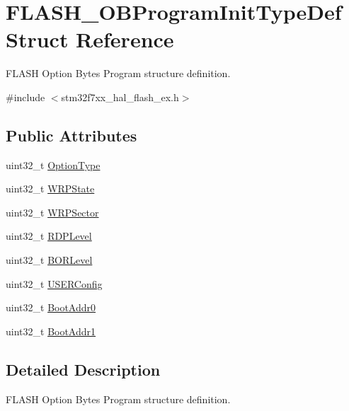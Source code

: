 \hypertarget{struct_f_l_a_s_h___o_b_program_init_type_def}{}\section{F\+L\+A\+S\+H\+\_\+\+O\+B\+Program\+Init\+Type\+Def Struct Reference}
\label{struct_f_l_a_s_h___o_b_program_init_type_def}


F\+L\+A\+SH Option Bytes Program structure definition.  




{\ttfamily \#include $<$stm32f7xx\+\_\+hal\+\_\+flash\+\_\+ex.\+h$>$}

\subsection*{Public Attributes}
\begin{DoxyCompactItemize}
\item 
uint32\+\_\+t \mbox{\hyperlink{struct_f_l_a_s_h___o_b_program_init_type_def_a46bffc2a63ea02e15b9187856535d890}{Option\+Type}}
\item 
uint32\+\_\+t \mbox{\hyperlink{struct_f_l_a_s_h___o_b_program_init_type_def_a2607ba046f7a3af46e7209b8f1e9e20d}{W\+R\+P\+State}}
\item 
uint32\+\_\+t \mbox{\hyperlink{struct_f_l_a_s_h___o_b_program_init_type_def_aa3db423f4b3038a56b67ca2d48af79ff}{W\+R\+P\+Sector}}
\item 
uint32\+\_\+t \mbox{\hyperlink{struct_f_l_a_s_h___o_b_program_init_type_def_a1f613ba2b87cf9caa84dc1d493e96dae}{R\+D\+P\+Level}}
\item 
uint32\+\_\+t \mbox{\hyperlink{struct_f_l_a_s_h___o_b_program_init_type_def_a51a6af507ed8f57590f19b6ba6c9c33d}{B\+O\+R\+Level}}
\item 
uint32\+\_\+t \mbox{\hyperlink{struct_f_l_a_s_h___o_b_program_init_type_def_aeee4c65d539a25d8bfc7f83c7dc29012}{U\+S\+E\+R\+Config}}
\item 
uint32\+\_\+t \mbox{\hyperlink{struct_f_l_a_s_h___o_b_program_init_type_def_a02ba9f1219abea2a6be8522095dc7f09}{Boot\+Addr0}}
\item 
uint32\+\_\+t \mbox{\hyperlink{struct_f_l_a_s_h___o_b_program_init_type_def_a2efa2648f7de9fbc82392ff117c390cf}{Boot\+Addr1}}
\end{DoxyCompactItemize}


\subsection{Detailed Description}
F\+L\+A\+SH Option Bytes Program structure definition. 

